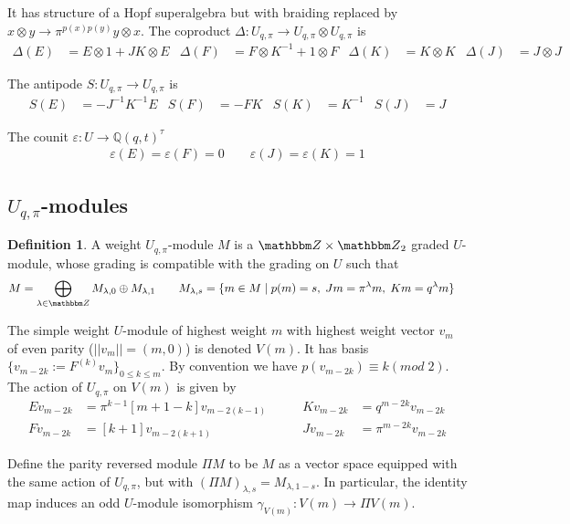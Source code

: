\documentclass{amsart}
\def\Q{\mathsf{Q}}
\theoremstyle{plain}
\theoremstyle{definition}
\newtheorem{definition}[theorem]{Definition}
\theoremstyle{definition}
\numberwithin{equation}{section}
\numberwithin{theorem}{section}
\renewcommand{\to}{\rightarrow}
\def\Q{\mathbb{Q}}
\numberwithin{equation}{section}
\def\ME#1{\textcolor[rgb]{0.40,0.00,0.90}{[ME: #1]}}%
\def\Z{{\mathbbm Z}}
\begin{document}
It has structure of a Hopf superalgebra\cite{CHW,CHW2, C} but with braiding replaced by $x\otimes y \to \pi^{p(x)p(y)}y\otimes x$.
The coproduct $\Delta:U_{q,\pi} \to U_{q,\pi}\otimes U_{q,\pi} $ is
\begin{align*}
  \Delta(E)&=E\otimes 1+ JK\otimes E & \Delta(F)&=F\otimes K^{-1}+1\otimes F & \Delta(K)&=K\otimes K & \Delta(J)&=J\otimes J
\end{align*}

The antipode $S:U_{q,\pi}\to U_{q,\pi}$ is
\begin{align*}
  S(E)&=-J^{-1}K^{-1}E & S(F)&=-FK  & S(K)&=K^{-1} & S(J)&=J
\end{align*}

The counit $\varepsilon:U \to \Q(q,t)^{\tau}$
\begin{align*}
  \varepsilon(E)=\varepsilon(F)=0 \qquad \varepsilon(J)=\varepsilon(K)=1
\end{align*}

\subsection{$U_{q,\pi}$-modules}\label{sec:U-modules}

\begin{definition}{\cite[Section 2.4]{C}}
  A weight $U_{q,\pi}$-module $M$ is a $\Z\times \Z_2 $ graded $U$-module, whose grading is compatible with the grading on $U$ such that
  \begin{align*}
    M=\bigoplus_{\lambda \in \Z} M_{\lambda,0}\oplus M_{\lambda,1} &\qquad M_{\lambda,s}=\{ m\in M \mid p(m)=s, \; Jm=\pi^\lambda m, \;Km=q^\lambda m \}
  \end{align*}
\end{definition}

The simple weight $U$-module of highest weight $m$ with highest weight vector $v_m$ of even parity ($||v_m||=(m,0)$) is denoted $V(m)$.
It has basis $\{v_{m-2k}:=F^{(k)}v_m\}_{0\leq k\leq m}$. By convention we have $p(v_{m-2k})\equiv k (mod\; 2)$. The action of $U_{q,\pi}$ on $V(m)$ is given by
\begin{align*}
  Ev_{m-2k}&=\pi^{k-1}[m+1-k]v_{m-2(k-1)}  &\qquad Kv_{m-2k}&=q^{m-2k}v_{m-2k}\\
  Fv_{m-2k}&=[k+1]v_{m-2(k+1)} & \qquad Jv_{m-2k}&=\pi^{m-2k}v_{m-2k}
\end{align*}

Define the parity reversed module $\Pi M$ to be $M$ as a vector space equipped with the same action of $U_{q,\pi}$, but with $(\Pi M)_{\lambda, s}=M_{\lambda,1-s}$.
In particular, the identity map induces an odd $U$-module isomorphism $\gamma_{V(m)}:V(m) \to \Pi V(m)$.
\end{document}
